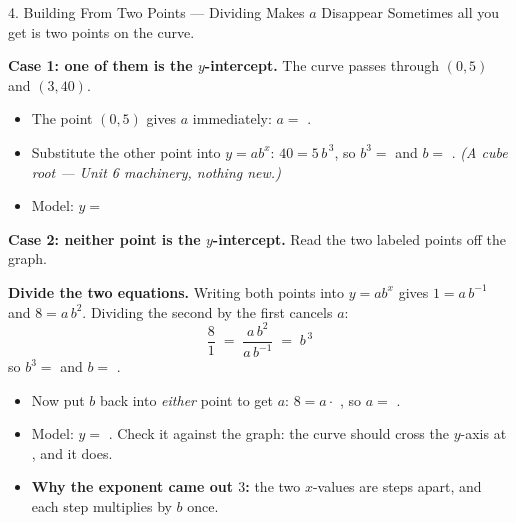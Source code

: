 \documentclass[10pt]{article}
\newcommand{\lgrid}[4]{%
  \draw[step=1, linegray!40, very thin] (#1,#3) grid (#2,#4);
  \draw[->, semithick, charcoal] (#1,0)--(#2,0) node[below right, font=\scriptsize]{$x$};
  \draw[->, semithick, charcoal] (0,#3)--(0,#4) node[left, font=\scriptsize]{$y$};}
\newcommand{\expcurve}[4]{\draw[very thick, forest, domain=#3:#4, samples=120, smooth]
  plot (\x,{#1*exp((#2)*(\x))});}
\begin{document}
\begin{notesbox}{4. Building From Two Points --- Dividing Makes $a$ Disappear}
Sometimes all you get is two points on the curve.

\vspace{3pt}
\textbf{Case 1: one of them is the $y$-intercept.} The curve passes through $(0,5)$ and $(3,40)$.
\begin{itemize}[leftmargin=1.5em, itemsep=3pt]
  \item The point $(0,5)$ gives $a$ immediately: $a=$ .
  \item Substitute the other point into $y=ab^{x}$: \; $40 = 5\,b^{\,3}$, so $b^{3}=$
         and $b=$ . \;
        \emph{(A cube root --- Unit 6 machinery, nothing new.)}
  \item Model: $y=$ 
\end{itemize}

\vspace{4pt}
\textbf{Case 2: neither point is the $y$-intercept.} Read the two labeled points off the graph.
\begin{center}
\begin{minipage}[c]{0.46\linewidth}
\centering
{}
\end{minipage}
\begin{minipage}[c]{0.50\linewidth}
\small
\textbf{Divide the two equations.} Writing both points into $y=ab^{x}$ gives
$1=a\,b^{-1}$ and $8=a\,b^{2}$. Dividing the second by the first cancels $a$:
\[
  \frac{8}{1} \;=\; \frac{a\,b^{2}}{a\,b^{-1}} \;=\; b^{\,3}
\]
so $b^{3}=$  and $b=$ .
\end{minipage}
\end{center}
\begin{itemize}[leftmargin=1.5em, itemsep=3pt]
  \item Now put $b$ back into \emph{either} point to get $a$: \; $8=a\cdot$ , so
        $a=$ .
  \item Model: $y=$ . \; Check it against the graph: the curve should cross the
        $y$-axis at , and it does.
  \item \textbf{Why the exponent came out $3$:} the two $x$-values are  steps apart,
        and each step multiplies by $b$ once.
\end{itemize}
\end{notesbox}
\end{document}
